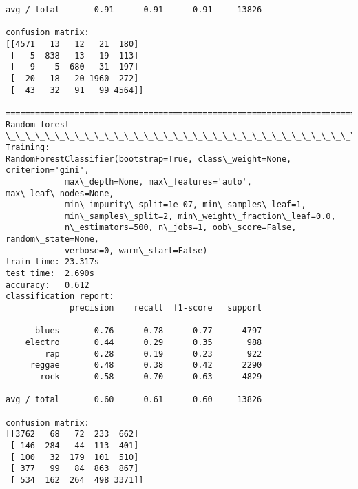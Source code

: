 \documentclass[11pt]{article}
\begin{document}
\begin{Verbatim}[commandchars=\\\{\}]
avg / total       0.91      0.91      0.91     13826

confusion matrix:
[[4571   13   12   21  180]
 [   5  838   13   19  113]
 [   9    5  680   31  197]
 [  20   18   20 1960  272]
 [  43   32   91   99 4564]]

================================================================================
Random forest
\_\_\_\_\_\_\_\_\_\_\_\_\_\_\_\_\_\_\_\_\_\_\_\_\_\_\_\_\_\_\_\_\_\_\_\_\_\_\_\_\_\_\_\_\_\_\_\_\_\_\_\_\_\_\_\_\_\_\_\_\_\_\_\_\_\_\_\_\_\_\_\_\_\_\_\_\_\_\_\_
Training: 
RandomForestClassifier(bootstrap=True, class\_weight=None, criterion='gini',
            max\_depth=None, max\_features='auto', max\_leaf\_nodes=None,
            min\_impurity\_split=1e-07, min\_samples\_leaf=1,
            min\_samples\_split=2, min\_weight\_fraction\_leaf=0.0,
            n\_estimators=500, n\_jobs=1, oob\_score=False, random\_state=None,
            verbose=0, warm\_start=False)
train time: 23.317s
test time:  2.690s
accuracy:   0.612
classification report:
             precision    recall  f1-score   support

      blues       0.76      0.78      0.77      4797
    electro       0.44      0.29      0.35       988
        rap       0.28      0.19      0.23       922
     reggae       0.48      0.38      0.42      2290
       rock       0.58      0.70      0.63      4829

avg / total       0.60      0.61      0.60     13826

confusion matrix:
[[3762   68   72  233  662]
 [ 146  284   44  113  401]
 [ 100   32  179  101  510]
 [ 377   99   84  863  867]
 [ 534  162  264  498 3371]]


    \end{Verbatim}
\end{document}
